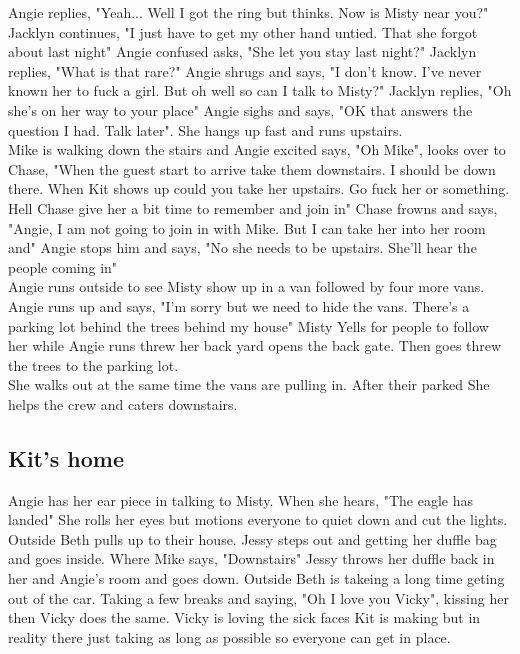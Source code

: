 \documentclass{article}[12px]
\begin{document}
	Angie replies, "Yeah... Well I got the ring but thinks. Now is Misty near you?" Jacklyn continues, "I just have to get my other hand untied. That she forgot about last night" Angie confused asks, "She let you stay last night?" Jacklyn replies, "What is that rare?" Angie shrugs and says, "I don't know. I've never known her to fuck a girl. But oh well so can I talk to Misty?" Jacklyn replies, "Oh she's on her way to your place" Angie sighs and says, "OK that answers the question I had. Talk later". She hangs up fast and runs upstairs. \\

	Mike is walking down the stairs and Angie excited says, "Oh Mike", looks over to Chase, "When the guest start to arrive take them downstairs. I should be down there. When Kit shows up could you take her upstairs. Go fuck her or something. Hell Chase give her a bit time to remember and join in" Chase frowns and says, "Angie, I am not going to join in with Mike. But I can take her into her room and" Angie stops him and says, "No she needs to be upstairs. She'll hear the people coming in" \\

	Angie runs outside to see Misty show up in a van followed by four more vans. Angie runs up and says, "I'm sorry but we need to hide the vans. There's a parking lot behind the trees behind my house" Misty Yells for people to follow her while Angie runs threw her back yard opens the back gate. Then goes threw the trees to the parking lot.\\

	She walks out at the same time the vans are pulling in. After their parked She helps the crew and caters downstairs.\\

\subsection* {Kit's home}
	Angie has her ear piece in talking to Misty. When she hears, "The eagle has landed" She rolls her eyes but motions everyone to quiet down and cut the lights. \\

	Outside Beth pulls up to their house. Jessy steps out and getting her duffle bag and goes inside. Where Mike says, "Downstairs" Jessy throws her duffle back in her and Angie's room and goes down. Outside Beth is takeing a long time geting out of the car. Taking a few breaks and saying, "Oh I love you Vicky", kissing her then Vicky does the same. Vicky is loving the sick faces Kit is making but in reality there just taking as long as possible so everyone can get in place. 
\end{document}

